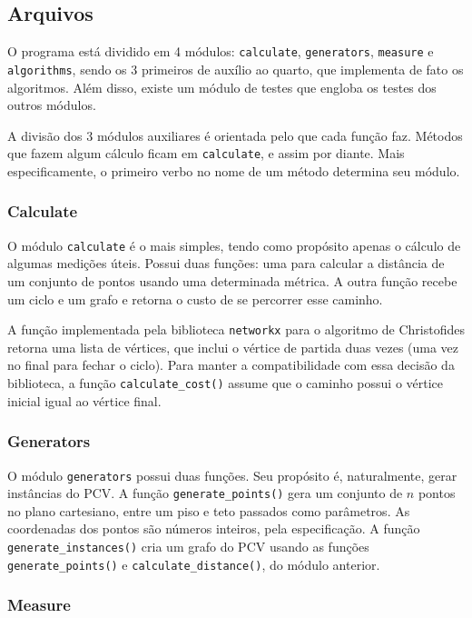\documentclass{article}
\begin{document}
\subsection{Arquivos}
O programa está dividido em 4 módulos: \texttt{calculate}, \texttt{generators}, \texttt{measure} e \texttt{algorithms}, sendo os 3 primeiros de auxílio ao quarto, que implementa de fato os algoritmos. Além disso, existe um módulo de testes que engloba os testes dos outros módulos.

A divisão dos 3 módulos auxiliares é orientada pelo que cada função faz. Métodos que fazem algum cálculo ficam em \texttt{calculate}, e assim por diante. Mais especificamente, o primeiro verbo no nome de um método determina seu módulo.

\subsubsection{Calculate}

O módulo \texttt{calculate} é o mais simples, tendo como propósito apenas o cálculo de algumas medições úteis. Possui duas funções: uma para calcular a distância de um conjunto de pontos usando uma determinada métrica. A outra função recebe um ciclo e um grafo e retorna o custo de se percorrer esse caminho.

A função implementada pela biblioteca \texttt{networkx} para o algoritmo de Christofides retorna uma lista de vértices, que inclui o vértice de partida duas vezes (uma vez no final para fechar o ciclo). Para manter a compatibilidade com essa decisão da biblioteca, a função \texttt{calculate\_cost()} assume que o caminho possui o vértice inicial igual ao vértice final.

\subsubsection{Generators}

O módulo \texttt{generators} possui duas funções. Seu propósito é, naturalmente, gerar instâncias do PCV. A função \texttt{generate\_points()} gera um conjunto de \( n \) pontos no plano cartesiano, entre um piso e teto passados como parâmetros. As coordenadas dos pontos são números inteiros, pela especificação. A função \texttt{generate\_instances()} cria um grafo do PCV usando as funções \texttt{generate\_points()} e \texttt{calculate\_distance()}, do módulo anterior.

\subsubsection{Measure}
\end{document}
